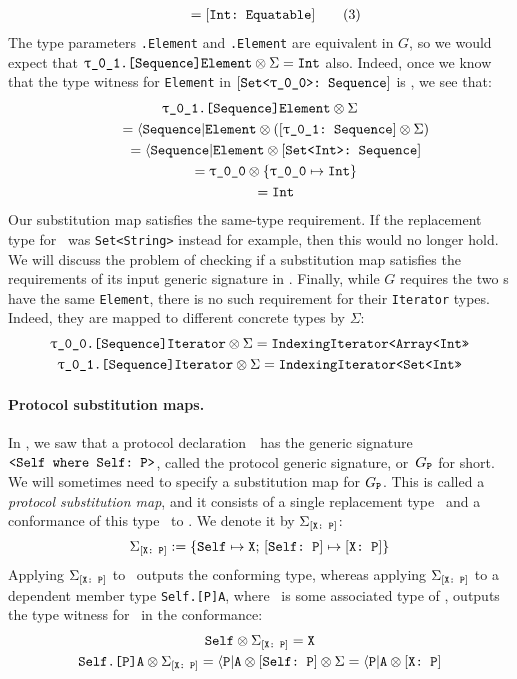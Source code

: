 \documentclass[../generics]{subfiles}
\begin{document}
\begin{example}
\begin{gather*}
\qquad {} = [\texttt{Int:~Equatable}]\tag{3}
\end{gather*}
The type parameters \texttt{\rT.Element} and \texttt{\rU.Element} are equivalent in $G$, so we would expect that $\texttt{\rU.[Sequence]Element}\otimes\Sigma=\texttt{Int}$ also. Indeed, once we know that the type witness for \texttt{Element} in $\ConfReq{Set<\rT>}{Sequence}$ is \rT, we see that:
\begin{gather*}
\texttt{\rU.[Sequence]Element}\otimes\Sigma\\
\qquad {} = \AElement \otimes (\rUSequence \otimes \Sigma)\\
\qquad {} = \AElement \otimes \ConfReq{Set<Int>}{Sequence}\\
\qquad {} = \rT \otimes \SubMapInt\\
\qquad {} = \texttt{Int}
\end{gather*}
Our substitution map satisfies the same-type requirement. If the replacement type for \rU\ was \texttt{Set<String>} instead for example, then this would no longer hold. We will discuss the problem of checking if a substitution map satisfies the requirements of its input generic signature in . Finally, while $G$ requires the two \tSequence{}s have the same \texttt{Element}, there is no such requirement for their \texttt{Iterator} types. Indeed, they are mapped to different concrete types by $\Sigma$:
\begin{gather*}
\texttt{\rT.[Sequence]Iterator}\otimes\Sigma = \texttt{IndexingIterator<Array<Int>>}\\
\texttt{\rU.[Sequence]Iterator}\otimes\Sigma = \texttt{IndexingIterator<Set<Int>>}
\end{gather*}
\end{example}
\paragraph{Protocol substitution maps.}
In , we saw that a protocol declaration~\tP\ has the generic signature $\verb|<Self where Self: P>|$, called the protocol generic signature, or~$G_{\texttt{P}}$ for short. We will sometimes need to specify a substitution map for $G_{\texttt{P}}$. This is called a \emph{protocol substitution map}, and it consists of a single replacement type \tX\, and a conformance of this type \tX\ to \tP. We denote it by $\Sigma_{[\texttt{X:~P}]}$:
\[\Sigma_{[\texttt{X:~P}]} := \{
\texttt{Self} \mapsto \texttt{X}
;\,
[\texttt{Self:~P}] \mapsto [\texttt{X:~P}]
\}\]
Applying $\Sigma_{[\texttt{X:~P}]}$ to \tSelf\ outputs the conforming type, whereas applying $\Sigma_{[\texttt{X:~P}]}$ to a dependent member type \texttt{Self.[P]A}, where \nA\ is some associated type of \tP, outputs the type witness for \nA\ in the conformance:
\begin{gather*}
\texttt{Self} \otimes \Sigma_{[\texttt{X:~P}]} = \texttt{X}\\
\texttt{Self.[P]A}\otimes\Sigma_{[\texttt{X:~P}]}=\langle\texttt{P}|\texttt{A}\otimes[\texttt{Self:~P}]\otimes\Sigma=\langle\texttt{P}|\texttt{A}\otimes[\texttt{X:~P}]
\end{gather*}
\end{document}
